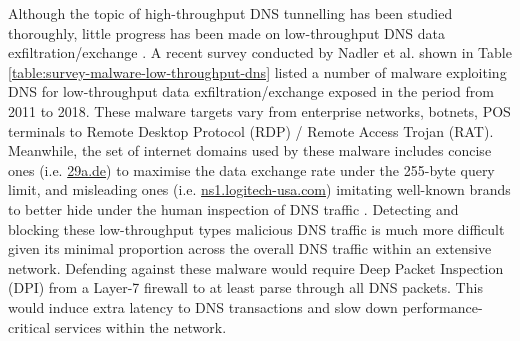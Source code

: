 \documentclass[a4paper]{report}
\begin{document}
\begin{table}[h]
\caption{A survery of malware from 2011-2018 exploiting DNS for low-throughput data exfiltration and exchange \cite{nadler-201936}}
\label{table:survey-malware-low-throughput-dns}
\end{table}

Although the topic of high-throughput DNS tunnelling has been studied thoroughly, little progress has been made on low-throughput DNS data exfiltration/exchange \cite{nadler-201936, steadman-2018, ahmed-2020}. A recent survey conducted by Nadler et al. \cite{nadler-201936} shown in Table \ref{table:survey-malware-low-throughput-dns} listed a number of malware exploiting DNS for low-throughput data exfiltration/exchange exposed in the period from 2011 to 2018. These malware targets vary from enterprise networks, botnets, POS terminals to Remote Desktop Protocol (RDP) / Remote Access Trojan (RAT). Meanwhile, the set of internet domains used by these malware includes concise ones (i.e. \url{29a.de}) to maximise the data exchange rate under the 255-byte query limit, and misleading ones (i.e. \url{ns1.logitech-usa.com}) imitating well-known brands to better hide under the human inspection of DNS traffic \cite{nadler-201936}. Detecting and blocking these low-throughput types malicious DNS traffic is much more difficult given its minimal proportion across the overall DNS traffic within an extensive network. Defending against these malware would require Deep Packet Inspection (DPI) from a Layer-7 firewall to at least parse through all DNS packets. This would induce extra latency to DNS transactions and slow down performance-critical services within the network. 
\end{document}

